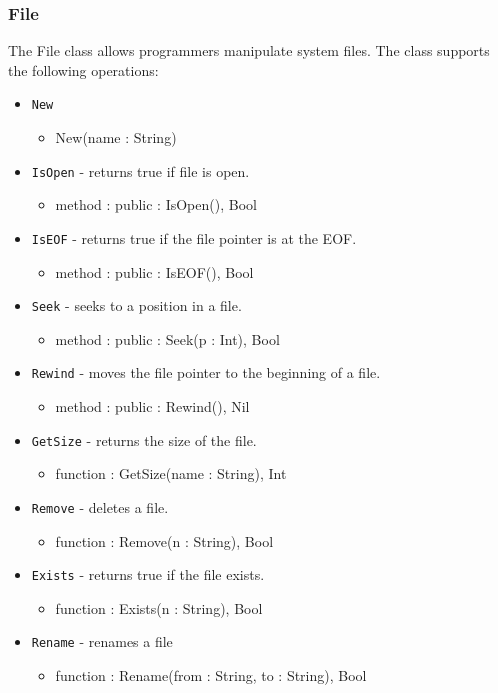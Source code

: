 \documentclass[12pt]{article}
\begin{document}
\subsubsection{File}
The File class allows programmers manipulate system files.    The class supports the following operations:
\begin{itemize}
    \item \texttt{New}
    	\begin{itemize}
	\item New(name : String)
	\end{itemize}
    \item \texttt{IsOpen} - returns true if file is open.
    	\begin{itemize}
	\item method : public : IsOpen(), Bool
	\end{itemize}
    \item \texttt{IsEOF} - returns true if the file pointer is at the EOF.
    	\begin{itemize}
	\item method : public : IsEOF(), Bool
	\end{itemize}
    \item \texttt{Seek} - seeks to a position in a file.
    	\begin{itemize}
	\item method : public : Seek(p : Int), Bool
	\end{itemize}
    \item \texttt{Rewind} - moves the file pointer to the beginning of a file.
    	\begin{itemize}
	\item method : public : Rewind(), Nil
	\end{itemize}
    \item \texttt{GetSize} - returns the size of the file.
    	\begin{itemize}
	\item function : GetSize(name : String), Int
	\end{itemize}
    \item \texttt{Remove} - deletes a file.
    	\begin{itemize}
	\item function : Remove(n : String), Bool
	\end{itemize}
    \item \texttt{Exists} - returns true if the file exists.
    	\begin{itemize}
	\item function : Exists(n : String), Bool
	\end{itemize}
    \item \texttt{Rename} - renames a file
    	\begin{itemize}
	\item function : Rename(from : String, to : String), Bool
	\end{itemize}
\end{itemize}
\end{document}
